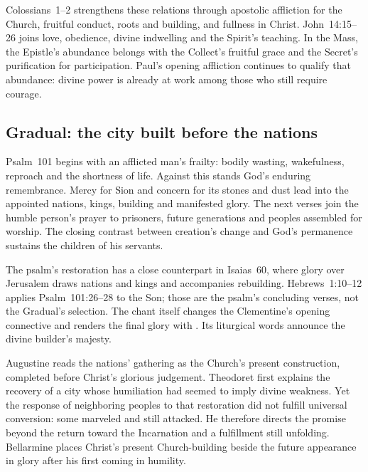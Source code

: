 Colossians~1--2 strengthens these relations through apostolic affliction for the Church, fruitful conduct, roots and building, and fullness in Christ. John~14:15--26 joins love, obedience, divine indwelling and the Spirit's teaching. In the Mass, the Epistle's abundance belongs with the Collect's fruitful grace and the Secret's purification for participation. Paul's opening affliction continues to qualify that abundance: divine power is already at work among those who still require courage.

\subsection*{Gradual: the city built before the nations}
Psalm~101 begins with an afflicted man's frailty: bodily wasting, wakefulness, reproach and the shortness of life. Against this stands God's enduring remembrance. Mercy for Sion and concern for its stones and dust lead into the appointed nations, kings, building and manifested glory. The next verses join the humble person's prayer to prisoners, future generations and peoples assembled for worship. The closing contrast between creation's change and God's permanence sustains the children of his servants. 

The psalm's restoration has a close counterpart in Isaias~60, where glory over Jerusalem draws nations and kings and accompanies rebuilding. Hebrews~1:10--12 applies Psalm~101:26--28 to the Son; those are the psalm's concluding verses, not the Gradual's selection. The chant itself changes the Clementine's opening connective and renders the final glory with . Its liturgical words announce the divine builder's majesty.

Augustine reads the nations' gathering as the Church's present construction, completed before Christ's glorious judgement. Theodoret first explains the recovery of a city whose humiliation had seemed to imply divine weakness. Yet the response of neighboring peoples to that restoration did not fulfill universal conversion: some marveled and still attacked. He therefore directs the promise beyond the return toward the Incarnation and a fulfillment still unfolding. Bellarmine places Christ's present Church-building beside the future appearance in glory after his first coming in humility. 

